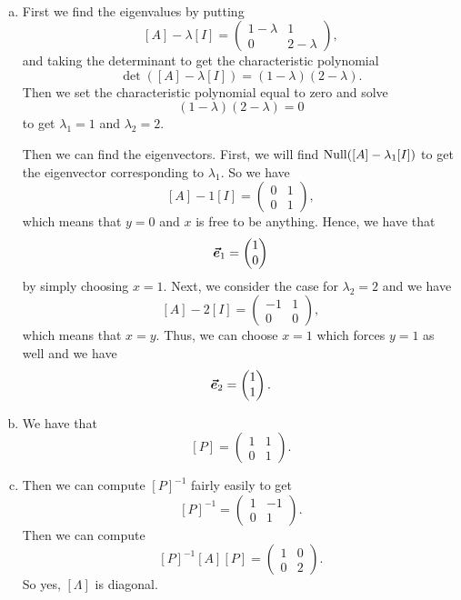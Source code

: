 \documentclass[12pt]{article} %
\begin{document}
\begin{solution}~
\begin{enumerate}[(a)]
    \item First we find the eigenvalues by putting
    \[
    [A]-\lambda [I] = \begin{pmatrix} 1 - \lambda & 1 \\ 0 & 2-\lambda \end{pmatrix},
    \]
    and taking the determinant to get the characteristic polynomial
    \[
    \det([A]-\lambda[I])=(1-\lambda)(2-\lambda).
    \]
    Then we set the characteristic polynomial equal to zero and solve
    \[
    (1-\lambda)(2-\lambda)=0
    \]
    to get $\lambda_1 = 1$ and $\lambda_2=2$.  
    
    Then we can find the eigenvectors. First, we will find $\mathrm{Null}([A]-\lambda_1 [I])$ to get the eigenvector corresponding to $\lambda_1$. So we have
    \[
    [A]-1[I]= \begin{pmatrix} 0 & 1 \\ 0 & 1 \end{pmatrix},
    \]
    which means that $y=0$ and $x$ is free to be anything. Hence, we have that
    \[
    \boldsymbol{\vec{e}}_1 = \begin{pmatrix} 1 \\ 0 \end{pmatrix}
    \]
    by simply choosing $x=1$. Next, we consider the case for $\lambda_2 = 2$ and we have
    \[
    [A]-2[I] = \begin{pmatrix} -1 & 1 \\ 0 & 0 \end{pmatrix},
    \]
    which means that $x=y$. Thus, we can choose $x=1$ which forces $y=1$ as well and we have
    \[
    \boldsymbol{\vec{e}}_2 = \begin{pmatrix} 1 \\ 1\end{pmatrix}.
    \]
    \item We have that
    \[
    [P]=\begin{pmatrix} 1 & 1 \\ 0 & 1 \end{pmatrix}.
    \]
    \item Then we can compute $[P]^{-1}$ fairly easily to get
    \[
    [P]^{-1} = \begin{pmatrix} 1 & -1\\ 0  & 1 \end{pmatrix}.
    \]
    Then we can compute
    \[
    [P]^{-1}[A][P] = \begin{pmatrix} 1 & 0 \\ 0 & 2 \end{pmatrix}.
    \]
    So yes, $[\Lambda]$ is diagonal.
\end{enumerate}
\end{solution}
\end{document}
